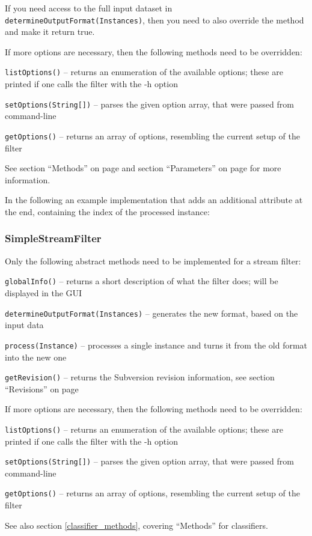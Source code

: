If you need access to the full input dataset
in \texttt{determineOutputFormat(Instances)}, then you need to also
override the method  and make it return true.

If more options are necessary, then the following methods need to be overridden:
\begin{tight_itemize}
  \item \texttt{listOptions()} -- returns an enumeration of the available
options; these are printed if one calls the filter with the -h option
  \item \texttt{setOptions(String[])} -- parses the given option array,
that were passed from command-line
  \item \texttt{getOptions()} -- returns an array of options, resembling
the current setup of the filter
\end{tight_itemize}
See section ``Methods'' on page \pageref{classifier_methods} and section
``Parameters'' on page \pageref{classifier_parameters} for more information.

\newpage
In the following an example implementation that adds an additional attribute at
the end, containing the index of the processed instance:

{\footnotesize }

\newpage
\subsubsection{SimpleStreamFilter}
Only the following abstract methods need to be implemented for a stream filter:
\begin{tight_itemize}
  \item \texttt{globalInfo()} -- returns a short description of what the filter
does; will be displayed in the GUI
  \item \texttt{determineOutputFormat(Instances)} -- generates the new
format, based on the input data
  \item \texttt{process(Instance)} -- processes a single instance and turns it
from the old format into the new one
  \item \texttt{getRevision()} -- returns the Subversion revision
information, see section ``Revisions'' on page \pageref{filter_revisions}
\end{tight_itemize}
If more options are necessary, then the following methods need to be overridden:
\begin{tight_itemize}
  \item \texttt{listOptions()} -- returns an enumeration of the available
options; these are printed if one calls the filter with the -h option
  \item \texttt{setOptions(String[])} -- parses the given option array,
that were passed from command-line
  \item \texttt{getOptions()} -- returns an array of options, resembling the
current setup of the filter
\end{tight_itemize}
See also section \ref{classifier_methods}, covering ``Methods'' for classifiers.

